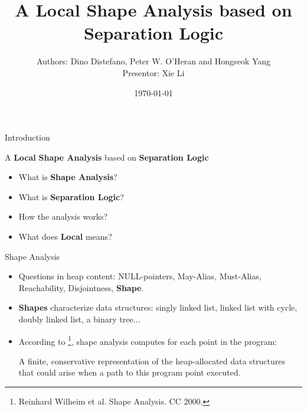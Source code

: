 \documentclass[aspectratio=1610, 13pt]{beamer}
\title{A Local Shape Analysis based on Separation Logic}
\date{\today}
\author{Authors: Dino Distefano, Peter W. O'Heran and Hongseok Yang\\Presentor: Xie Li}
\begin{document}
\maketitle
\begin{frame}{Introduction}
    \begin{center}
        A \textbf{Local} \textbf{Shape Analysis} based on \textbf{Separation Logic}
    \end{center}
    
\begin{itemize}
    \item What is \textbf{Shape Analysis}?
    \item What is \textbf{Separation Logic}?
    \item How the analysis works?
    \item What does \textbf{Local} means?

\end{itemize}
\end{frame}



\begin{frame}{Shape Analysis}
\begin{itemize}
    \item Questions in heap content: NULL-pointers, May-Alias, Must-Alias,  Reachability, Disjointness, \textbf{Shape}.
    
    \item \textbf{Shapes} characterize data structures: singly linked list, linked list with cycle, doubly linked list, a binary tree...
    
    \item According to \footnote{Reinhard Wilheim et al. Shape Analysis. CC 2000.}, shape analysis computes for each point in the program:
    
    A finite, conservative representation of the heap-allocated data structures that could arise when a path to this program point executed.
\end{itemize}
    
\end{frame}
\end{document}
